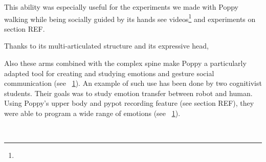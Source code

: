 This ability was especially useful for the experiments we made with Poppy walking while being socially guided by its hands see videos\footnote{} and experiments on section REF.

Thanks to its multi-articulated structure and its expressive head,

Also these arms combined with the complex spine make Poppy a particularly adapted tool for creating and studying emotions and gesture social communication (see \figurename~\ref{fig:TER_cognitic}). An example of such use has been done by two cognitivist students. Their goals was to study emotion transfer between robot and human. Using Poppy's upper body and pypot recording feature (see section REF), they were able to program a wide range of emotions (see \figurename~\ref{fig:TER_cognitic}).


\begin{figure}[tb]
\centering
    \hfil
    \\
    \hfil
    \caption{}
    \label{fig:TER_cognitic}
\end{figure}


%




